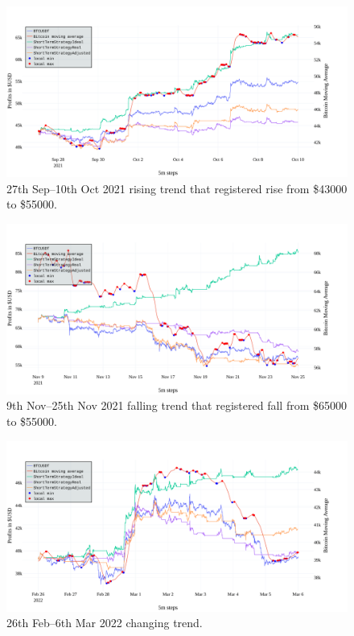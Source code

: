 \begin{figure}[!t]
    \centering
    \includegraphics[width=\columnwidth]{figures/short-term-rising.pdf}
    \caption{27th Sep--10th Oct 2021 rising trend that registered rise from \$43000 to \$55000.}
    \label{figure-short-term-rising}
\end{figure}

\begin{figure}[!t]
    \centering
    \includegraphics[width=\columnwidth]{figures/short-term-falling.pdf}
    \caption{9th Nov--25th Nov 2021 falling trend that registered fall from \$65000 to \$55000.}
    \label{figure-short-term-falling}
\end{figure}

\begin{figure}[!t]
    \centering
    \includegraphics[width=\columnwidth]{figures/short-term-changing.pdf}
    \caption{26th Feb--6th Mar 2022 changing trend.}
    \label{figure-short-term-changing}
\end{figure}

